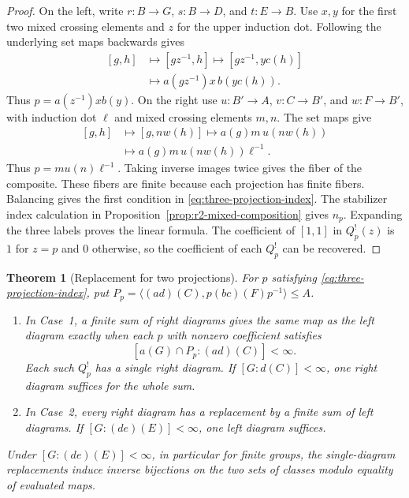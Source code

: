 \documentclass[11pt,a4paper]{article}
\numberwithin{equation}{section}
\newtheorem{theorem}{Theorem}[section]
\theoremstyle{definition}
\begin{document}
\begin{proof}
On the left, write \(r:B\to G\), \(s:B\to D\), and \(t:E\to B\).
Use \(x,y\) for the first two mixed crossing elements and \(z\) for the upper
induction dot. Following the underlying set maps backwards gives
\[
 \begin{aligned}
 {[g,h]}&\longmapsto[gz^{-1},h]\longmapsto[gz^{-1},y c(h)]\\
      &\longmapsto a(gz^{-1})x\,b(yc(h)).
 \end{aligned}
\]
Thus \(p=a(z^{-1})x b(y)\). On the right use
\(u:B'\to A\), \(v:C\to B'\), and \(w:F\to B'\), with induction dot \(\ell\)
and mixed crossing elements \(m,n\). The set maps give
\[
 \begin{aligned}
 {[g,h]}&\longmapsto[g,nw(h)]\longmapsto a(g)m\,u(nw(h))\\
      &\longmapsto a(g)m\,u(nw(h))\ell^{-1}.
 \end{aligned}
\]
Thus \(p=m u(n)\ell^{-1}\). Taking inverse images twice gives the fiber of the composite.
These fibers are finite because each projection has finite fibers. Balancing gives the first condition in
\eqref{eq:three-projection-index}. The stabilizer index calculation in
Proposition~\ref{prop:r2-mixed-composition} gives \(n_p\).
Expanding the three labels proves the linear formula. The coefficient
of \([1,1]\) in \(Q_p^!(z)\) is \(1\) for \(z=p\) and \(0\) otherwise,
so the coefficient of each \(Q_p^!\) can be recovered.
\end{proof}

\begin{theorem}[Replacement for two projections]\label{thm:three-projections}
For \(p\) satisfying \eqref{eq:three-projection-index}, put
\(P_p=\langle (ad)(C),p(bc)(F)p^{-1}\rangle\le A\).
\begin{enumerate}
\item In Case~1, a finite sum of right diagrams gives the same map as
the left diagram exactly when each \(p\) with nonzero coefficient satisfies
\begin{equation}\label{eq:three-middle-index}
 [a(G)\cap P_p:(ad)(C)]<\infty.
\end{equation}
Each such \(Q_p^!\) has a single right diagram.
If \([G:d(C)]<\infty\), one right diagram suffices for the whole sum.
\item In Case~2, every right diagram has a replacement by a finite sum
of left diagrams. If \([G:(de)(E)]<\infty\), one left diagram suffices.
\end{enumerate}
Under \([G:(de)(E)]<\infty\), in particular for finite groups, the
single-diagram replacements induce inverse bijections on the two
sets of classes modulo equality of evaluated maps.
\end{theorem}
\end{document}
